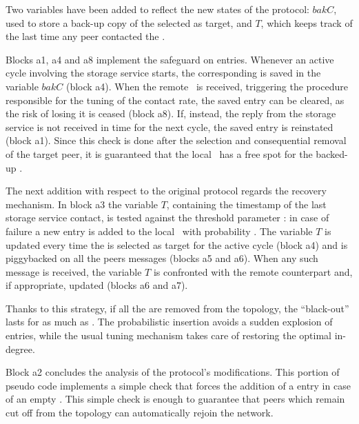 Two variables have been added to reflect the new states of the protocol:
$bakC$, used to store a back-up copy of the \cloud \descriptor selected
as target, and $T$, which keeps track of the last time any peer
contacted the \cloud.

Blocks a1, a4 and a8 implement the safeguard on
\cloud entries. Whenever an active cycle involving the storage
service starts, the corresponding \cloud \descriptor is saved in the
variable $bakC$ (block a4). When the remote \view\ is received,
triggering the procedure responsible for the tuning of the
\cloud contact rate, the saved entry can be cleared, as the risk of
losing it is ceased (block a8). If, instead, the reply from the storage
service is not received in time for the next cycle, the saved entry is
reinstated (block a1). Since this check is done after the selection and
consequential removal of the target peer, it is guaranteed that the local
\view\ has a free spot for the backed-up \cloud \descriptor.

The next addition with respect to the original protocol regards the
recovery mechanism. In block a3 the variable $T$, containing the
timestamp of the last storage service contact, is tested against the
threshold parameter \maxsilence: in case of failure a new
\cloud entry is added to the local \view\ with probability
\spawnprob. The variable $T$ is updated every time the
\cloud is selected as target for the active cycle (block a4) and is
piggybacked on all the peers messages (blocks a5 and a6). When any
such message is received, the variable $T$ is confronted with the
remote counterpart and, if appropriate, updated (blocks a6 and a7).

Thanks to this strategy, if all the \cloud \descriptors are removed
from the topology, the ``black-out'' lasts for as much as
\maxsilence. The probabilistic insertion avoids a sudden explosion of
\cloud entries, while the usual tuning mechanism takes care of
restoring the optimal in-degree.

Block a2 concludes the analysis of the protocol's modifications. This
portion of pseudo code implements a simple check that forces the
addition of a \cloud entry in case of an empty \view. This simple
check is enough to guarantee that peers which remain cut off from the
topology can automatically rejoin the network.
